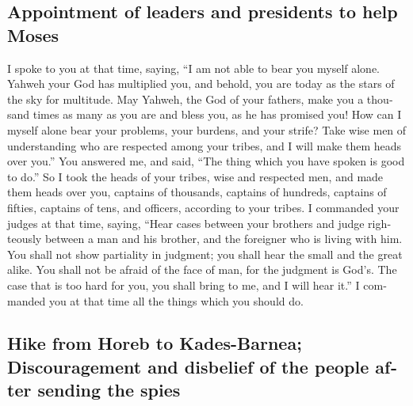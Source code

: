 \begin{paracol}{2}
\begin{otherlanguage}{english}
\hypertarget{appointment-of-leaders-and-presidents-to-help-moses}{%
\subsection{Appointment of leaders and presidents to help
Moses}\label{appointment-of-leaders-and-presidents-to-help-moses}}

 I spoke to you at that time, saying, ``I am not able to
bear you myself alone.  Yahweh your God has multiplied
you, and behold, you are today as the stars of the sky for multitude.
 May Yahweh, the God of your fathers, make you a thousand
times as many as you are and bless you, as he has promised you!
 How can I myself alone bear your problems, your burdens,
and your strife?  Take wise men of understanding who are
respected among your tribes, and I will make them heads over you.''
 You answered me, and said, ``The thing which you have
spoken is good to do.''  So I took the heads of your
tribes, wise and respected men, and made them heads over you, captains
of thousands, captains of hundreds, captains of fifties, captains of
tens, and officers, according to your tribes.  I
commanded your judges at that time, saying, ``Hear cases between your
brothers and judge righteously between a man and his brother, and the
foreigner who is living with him.  You shall not show
partiality in judgment; you shall hear the small and the great alike.
You shall not be afraid of the face of man, for the judgment is God's.
The case that is too hard for you, you shall bring to me, and I will
hear it.''  I commanded you at that time all the things
which you should do.

\hypertarget{hike-from-horeb-to-kades-barnea-discouragement-and-disbelief-of-the-people-after-sending-the-spies}{%
\subsection{Hike from Horeb to Kades-Barnea; Discouragement and
disbelief of the people after sending the
spies}\label{hike-from-horeb-to-kades-barnea-discouragement-and-disbelief-of-the-people-after-sending-the-spies}}


\end{otherlanguage}
\end{paracol}
